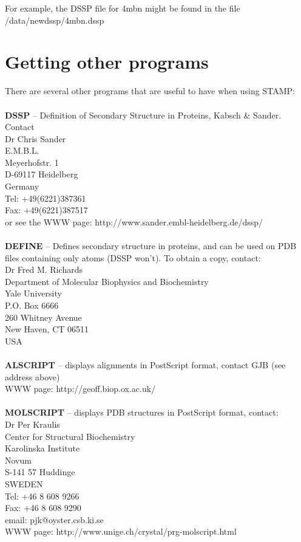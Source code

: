 For example, the DSSP file for 4mbn might be found in the file 
/data/newdssp/4mbn.dssp

\section{Getting other programs}

There are several other programs that are useful to have when using STAMP:\\
\\
{\bf DSSP} -- Definition of Secondary Structure in Proteins, Kabsch \& Sander.  Contact\\
Dr Chris Sander\\
E.M.B.L.\\
Meyerhofstr. 1\\
D-69117 Heidelberg\\
Germany\\
Tel: +49(6221)387361\\
Fax: +49(6221)387517\\
or see the WWW page: http://www.sander.embl-heidelberg.de/dssp/\\
\\
{\bf DEFINE} -- Defines secondary structure in proteins, and can be used on PDB files containing
only \Cal atoms (DSSP won't).  To obtain a copy, contact:\\
Dr Fred M. Richards\\
Department of Molecular Biophysics and Biochemistry\\
Yale University\\
P.O. Box 6666\\
260 Whitney Avenue\\
New Haven, CT 06511\\
USA\\
\\
{\bf ALSCRIPT} -- displays alignments in PostScript format, contact GJB (see address above)\\
WWW page: http://geoff.biop.ox.ac.uk/\\
\\
{\bf MOLSCRIPT} -- displays PDB structures in PostScript format, contact:\\
Dr Per Kraulis \\
Center for Structural Biochemistry \\
Karolinska Institute \\
Novum \\
S-141 57 Huddinge \\
SWEDEN\\
Tel: +46 8 608 9266 \\
Fax: +46 8 608 9290 \\
email: pjk@oyster.csb.ki.se \\
WWW page: http://www.unige.ch/crystal/prg-molscript.html




